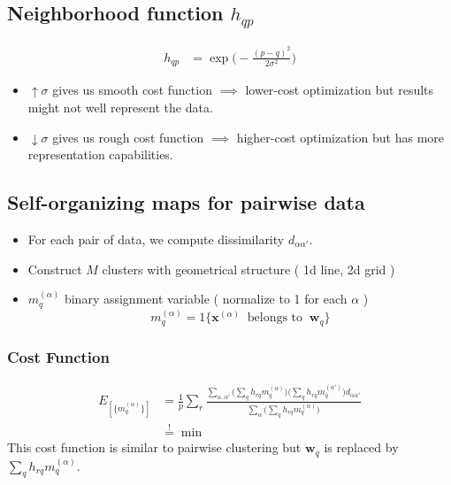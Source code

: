 \subsection{Neighborhood function $h_{qp}$}
\begin{align*}
	h_{qp}  &= \exp{ \bigg (  - \frac{(p-q)^2}{2\sigma^2} \bigg) } 
\end{align*}
\begin{itemize}
	\item $\uparrow \sigma$ gives us smooth cost function $\implies$ lower-cost optimization but results might not well represent the data.
	\item $\downarrow \sigma$ gives us rough cost function $\implies$ higher-cost optimization but has more representation capabilities.
\end{itemize}

\subsection{Self-organizing maps for pairwise data}
\begin{itemize}
	\item For each pair of data, we compute dissimilarity $d_{\alpha\alpha'}$.
	\item Construct $M$ clusters with geometrical structure ( 1d line, 2d grid )
	\item $m_q^{(\alpha)}$ binary assignment variable ( normalize to 1 for each $\alpha$ )
$$
m_q^{(\alpha)} = \text{1}\{  \boldsymbol{x}^{(\alpha)} \ \text{ belongs to } \ \boldsymbol{w}_q \}
$$
\end{itemize}
\subsubsection{Cost Function}

\begin{align*}
	E_{ [ \{ m_{q}^{(\alpha)} \} ] } &=  \frac{1}{p} \sum_r \frac{ \sum_{\alpha,\alpha'} \bigg (\sum_q h_{rq} m_q^{(\alpha)} \bigg ) \bigg (\sum_q h_{rq} m_q^{(\alpha')} \bigg ) d_{\alpha\alpha'} }{ \sum_\alpha \bigg (\sum_q h_{rq} m_q^{(\alpha)} \bigg ) } \\
	&\stackrel{!}{=} \min
\end{align*}
This cost function is similar to pairwise clustering but $\boldsymbol{w}_q$ is replaced by $\sum_q h_{rq} m_q^{(\alpha)}$.

